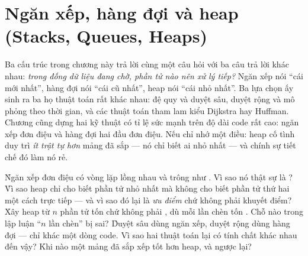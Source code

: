 \documentclass[../../algorithm.tex]{subfiles}
\begin{document}
\chapter{Ngăn xếp, hàng đợi và heap (Stacks, Queues, Heaps)}

\begin{tomtat}
Ba cấu trúc trong chương này trả lời cùng một câu hỏi với ba câu trả lời khác nhau: \emph{trong đống dữ liệu đang chờ, phần tử nào nên xử lý tiếp?} Ngăn xếp nói ``cái mới nhất'', hàng đợi nói ``cái cũ nhất'', heap nói ``cái nhỏ nhất''. Ba lựa chọn ấy sinh ra ba họ thuật toán rất khác nhau: đệ quy và duyệt sâu, duyệt rộng và mô phỏng theo thời gian, và các thuật toán tham lam kiểu Dijkstra hay Huffman. Chương cũng dựng hai kỹ thuật có tỉ lệ sức mạnh trên độ dài code rất cao: ngăn xếp đơn điệu và hàng đợi hai đầu đơn điệu. Nếu chỉ nhớ một điều: heap cố tình duy trì \emph{ít trật tự hơn} mảng đã sắp --- nó chỉ biết ai nhỏ nhất --- và chính sự tiết chế đó làm nó rẻ.
\end{tomtat}

\begin{nentang}
\end{nentang}

\begin{khoigoi}
\h{Ngăn xếp đơn điệu có vòng lặp lồng nhau và trông như . Vì sao nó thật sự là ?}
\h{Vì sao heap chỉ cho biết phần tử nhỏ nhất mà không cho biết phần tử thứ hai một cách trực tiếp --- và vì sao đó lại là \emph{ưu điểm} chứ không phải khuyết điểm?}
\h{Xây heap từ \(n\) phần tử tốn  chứ không phải , dù mỗi lần chèn tốn . Chỗ nào trong lập luận ``\(n\) lần chèn'' bị sai?}
\h{Duyệt sâu dùng ngăn xếp, duyệt rộng dùng hàng đợi --- chỉ khác một dòng code. Vì sao hai thuật toán lại có tính chất khác nhau đến vậy?}
\h{Khi nào một mảng đã sắp xếp tốt hơn heap, và ngược lại?}
\end{khoigoi}
\end{document}
